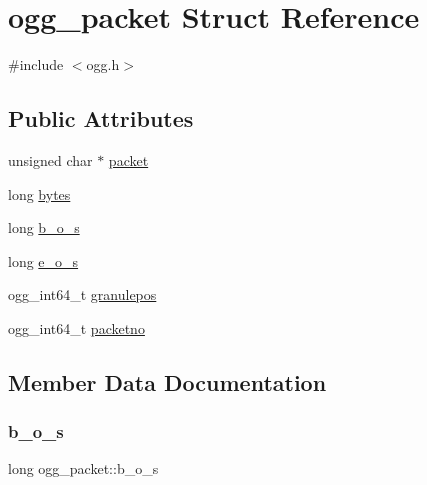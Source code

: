 \hypertarget{structogg__packet}{}\section{ogg\+\_\+packet Struct Reference}
\label{structogg__packet}


{\ttfamily \#include $<$ogg.\+h$>$}

\subsection*{Public Attributes}
\begin{DoxyCompactItemize}
\item 
unsigned char $\ast$ \mbox{\hyperlink{structogg__packet_a57e7096985ec8766dce415e248767c32}{packet}}
\item 
long \mbox{\hyperlink{structogg__packet_a4438269ce6025d8817865ae66d5881f1}{bytes}}
\item 
long \mbox{\hyperlink{structogg__packet_adbf12677237d6f5333017de9b59b4ea7}{b\+\_\+o\+\_\+s}}
\item 
long \mbox{\hyperlink{structogg__packet_aa367e7c5425c5f65cbd126b82dfc72e8}{e\+\_\+o\+\_\+s}}
\item 
ogg\+\_\+int64\+\_\+t \mbox{\hyperlink{structogg__packet_a838d9a000e08bae982409bc2734fc566}{granulepos}}
\item 
ogg\+\_\+int64\+\_\+t \mbox{\hyperlink{structogg__packet_a60e257b3a8f843135474457197c65a45}{packetno}}
\end{DoxyCompactItemize}


\subsection{Member Data Documentation}
\mbox{\label{structogg__packet_adbf12677237d6f5333017de9b59b4ea7}} 
\subsubsection{\texorpdfstring{b\+\_\+o\+\_\+s}{b\_o\_s}}
{\footnotesize\ttfamily long ogg\+\_\+packet\+::b\+\_\+o\+\_\+s}

\mbox{\label{structogg__packet_a4438269ce6025d8817865ae66d5881f1}} 
